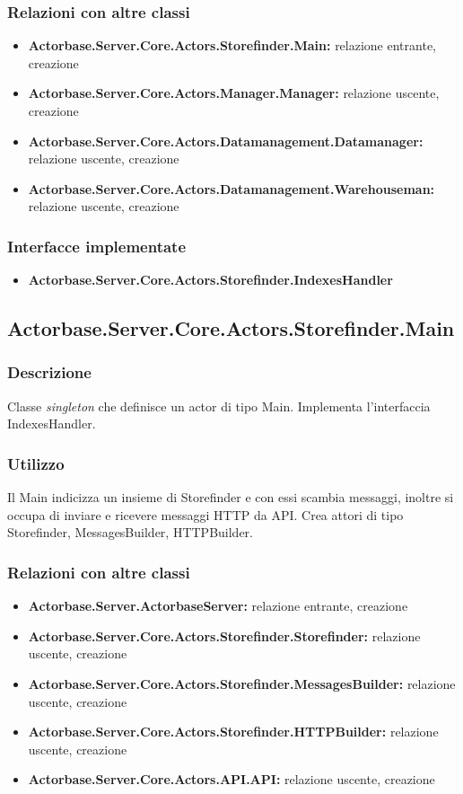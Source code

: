 \documentclass[a4paper]{article}
\begin{document}
			\subsubsection{Relazioni con altre classi}
			\begin{itemize}
				\item \textbf{Actorbase.Server.Core.Actors.Storefinder.Main:} relazione entrante, creazione
				\item \textbf{Actorbase.Server.Core.Actors.Manager.Manager:} relazione uscente, creazione
				\item \textbf{Actorbase.Server.Core.Actors.Datamanagement.Datamanager:} relazione uscente, creazione
				\item \textbf{Actorbase.Server.Core.Actors.Datamanagement.Warehouseman:} relazione uscente, creazione
			\end{itemize}
			\subsubsection{Interfacce implementate}
			\begin{itemize}
				\item \textbf{Actorbase.Server.Core.Actors.Storefinder.IndexesHandler} 
			\end{itemize}

		\subsection{Actorbase.Server.Core.Actors.Storefinder.Main}
			\subsubsection{Descrizione}
				Classe \emph{singleton} che definisce un actor di tipo Main. Implementa l'interfaccia IndexesHandler.
			\subsubsection{Utilizzo}
				Il Main indicizza un insieme di Storefinder e con essi scambia messaggi, inoltre si occupa di inviare e ricevere messaggi HTTP da API. Crea attori di tipo Storefinder, MessagesBuilder, HTTPBuilder.
			\subsubsection{Relazioni con altre classi}
			\begin{itemize}
				\item \textbf{Actorbase.Server.ActorbaseServer:} relazione entrante, creazione
				\item \textbf{Actorbase.Server.Core.Actors.Storefinder.Storefinder:} relazione uscente, creazione
				\item \textbf{Actorbase.Server.Core.Actors.Storefinder.MessagesBuilder:} relazione uscente, creazione
				\item \textbf{Actorbase.Server.Core.Actors.Storefinder.HTTPBuilder:} relazione uscente, creazione
				\item \textbf{Actorbase.Server.Core.Actors.API.API:} relazione uscente, creazione
			\end{itemize}
\end{document}
